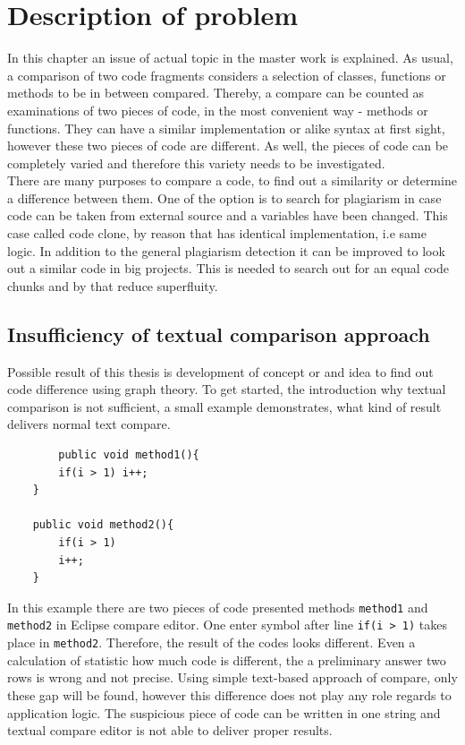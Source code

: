\documentclass{report}
\begin{document}
\chapter{Description of problem}
\label{cha:Description}
In this chapter an issue of actual topic in the master work is explained. As usual, a comparison of two code fragments considers a selection of classes, functions or methods to be in between compared. Thereby, a compare can be counted as examinations of two pieces of code, in the most convenient way - methods or functions. They can have a similar implementation or alike syntax at first sight, however these two pieces of code are different. As well, the pieces of code can be completely varied and therefore this variety needs to be investigated. 
\\
There are many purposes to compare a code, to find out a similarity or determine a difference between them. One of the option is to search for plagiarism in case code can be taken from external source and a variables have been changed. This case called code clone, by reason that has identical implementation, i.e same logic. In addition to the general plagiarism detection it can be improved to look out a similar code in big projects. This is needed to search out for an equal code chunks and by that reduce superfluity.

\section{Insufficiency of textual comparison approach}
Possible result of this thesis is development of concept or and idea to find out code difference using graph theory. To get started, the introduction why textual comparison is not sufficient, a small example demonstrates, what kind of result delivers normal text compare. \newpage
\begin{lstlisting}
		public void method1(){
		if(i > 1) i++;
	}
	
	public void method2(){
		if(i > 1) 
		i++;
	}

\end{lstlisting}
	
In this example there are two pieces of code presented methods \texttt{method1} and \texttt{method2} in Eclipse compare editor. One enter symbol after line \texttt{if(i > 1)} takes place in \texttt{method2}. Therefore, the result of the codes looks different. Even a calculation of statistic how much code is different, the a preliminary answer two rows is wrong and not precise.
Using simple text-based approach of compare, only these gap will be found, however this difference does not play any role regards to application logic. The suspicious piece of code can be written in one string and textual compare editor is not able to deliver proper results.
\end{document}
